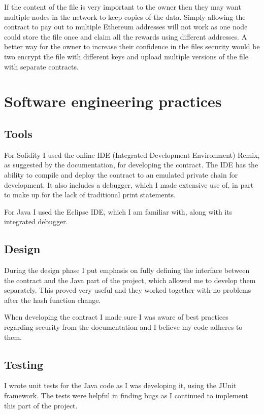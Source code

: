 \documentclass[12pt,a4paper,twoside,openright]{report}
\begin{document}
If the content of the file is very important to the owner then they may want multiple nodes in the network to keep copies of the data.
Simply allowing the contract to pay out to multiple Ethereum addresses will not work as one node could store the file once and claim all the rewards
using different addresses.
A better way for the owner to increase their confidence in the files security would be two encrypt the file with different keys and
upload multiple versions of the file with separate contracts.



\section{Software engineering practices}

\subsection{Tools}

For Solidity I used the online IDE (Integrated Development Environment) Remix\cite{browser-solidity}, as suggested by the documentation, for developing the contract.
The IDE has the ability to compile and deploy the contract to an emulated private chain for development.
It also includes a debugger, which I made extensive use of, in part to make up for the lack of traditional print statements.

For Java I used the Eclipse IDE, which I am familiar with, along with its integrated debugger.

\subsection{Design}

During the design phase I put emphasis on fully defining the interface between the contract and the Java part of the project, which allowed me to develop them separately.
This proved very useful and they worked together with no problems after the hash function change.

When developing the contract I made sure I was aware of best practices regarding security from the documentation\cite{solidity-docs-security}
and I believe my code adheres to them.


\subsection{Testing}

I wrote unit tests for the Java code as I was developing it, using the JUnit framework.
The tests were helpful in finding bugs as I continued to implement this part of the project.
\end{document}
